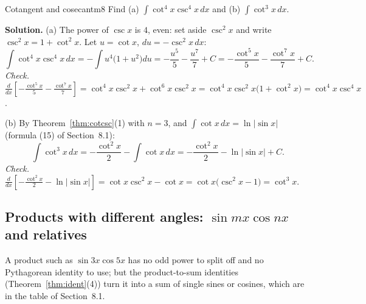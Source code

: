 \documentclass[11pt]{article}
\begin{document}
\begin{exmp}{Cotangent and cosecant}{m8}
Find (a) $\int\cot^4x\csc^4x\,dx$ and (b) $\int\cot^3x\,dx$.

\textbf{Solution.} (a) The power of $\csc x$ is $4$, even: set aside $\csc^2x$ and write $\csc^2x=1+\cot^2x$. Let $u=\cot x$, $du=-\csc^2x\,dx$:
\[\int\cot^4x\csc^4x\,dx=-\int u^4\big(1+u^2\big)du=-\frac{u^5}5-\frac{u^7}7+C=-\frac{\cot^5x}5-\frac{\cot^7x}7+C .\]
\emph{Check.} $\frac{d}{dx}\left[-\frac{\cot^5x}5-\frac{\cot^7x}7\right]=\cot^4x\csc^2x+\cot^6x\csc^2x=\cot^4x\csc^2x\big(1+\cot^2x\big)=\cot^4x\csc^4x$.

(b) By Theorem~\ref{thm:cotcsc}(1) with $n=3$, and $\int\cot x\,dx=\ln\lvert\sin x\rvert$ (formula (15) of Section~8.1):
\[\int\cot^3x\,dx=-\frac{\cot^2x}2-\int\cot x\,dx=-\frac{\cot^2x}2-\ln\lvert\sin x\rvert+C .\]
\emph{Check.} $\frac{d}{dx}\left[-\frac{\cot^2x}2-\ln\lvert\sin x\rvert\right]=\cot x\csc^2x-\cot x=\cot x\big(\csc^2x-1\big)=\cot^3x$.
\end{exmp}

\subsection*{Products with different angles: $\sin mx\cos nx$ and relatives}

A product such as $\sin3x\cos5x$ has no odd power to split off and no Pythagorean identity to use; but the product-to-sum identities (Theorem~\ref{thm:ident}(4)) turn it into a sum of single sines or cosines, which are in the table of Section~8.1.
\end{document}
